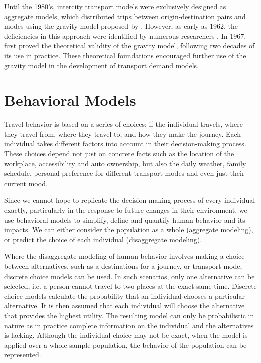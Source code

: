 Until the 1980’s, intercity transport models were exclusively designed as aggregate models, which distributed trips between origin-destination pairs and modes using the gravity model proposed by \textcite{casey55}. However, as early as 1962, the deficiencies in this approach were identified by numerous researchers \parencite{OiSchu62, Warner62}. In 1967, \textcite{Wilson67} first proved the theoretical validity of the gravity model, following two decades of its use in practice. These theoretical foundations encouraged further use of the gravity model in the development of transport demand models. 


\section{Behavioral Models}
Travel behavior is based on a series of choices; if the individual travels, where they travel from, where they travel to, and how they make the journey. Each individual takes different factors into account in their decision-making process. These choices depend not just on concrete facts such as the location of the workplace, accessibility and auto ownership, but also the daily weather, family schedule, personal preference for different transport modes and even just their current mood.

Since we cannot hope to replicate the decision-making process of every individual exactly, particularly in the response to future changes in their environment,  we use behavioral models to simplify, define and quantify human behavior and its impacts. We can either consider the population as a whole (aggregate modeling), or predict the choice of each individual (disaggregate modeling).

Where the disaggregate modeling of human behavior involves making a choice between alternatives, such as a destinations for a journey, or transport mode, discrete choice models can be used. In such scenarios, only one alternative can be selected, i.e. a person cannot travel to two places at the exact same time. Discrete choice models calculate the probability that an individual chooses a particular alternative. It is then assumed that each individual will choose the alternative that provides the highest utility. The resulting model can only be probabilistic in nature as in practice complete information on the individual and the alternatives is lacking. Although the individual choice may not be exact, when the model is applied  over a whole sample population, the behavior of the population can be represented.  



